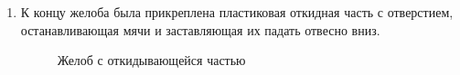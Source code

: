 \begin{enumerate}
\begin{enumerate}
		\item К концу желоба была прикреплена пластиковая откидная часть с отверстием, останавливающая мячи и заставляющая их падать отвесно вниз.
		\begin{figure}[H]
			\begin{minipage}[h]{0.47\linewidth}
			\end{minipage}
			\hfill
			\begin{minipage}[h]{0.47\linewidth}
			\end{minipage}
			\caption{Желоб с откидывающейся частью}
		\end{figure}
		

\end{enumerate}
\end{enumerate}
